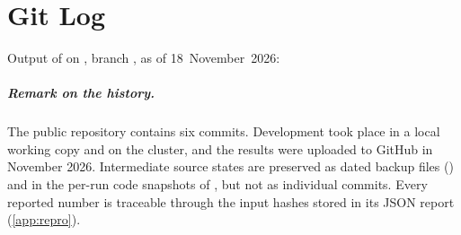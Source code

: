 \chapter{Git Log}\label{app:git}

Output of  on \RepositoryURL, branch , as of
18~November~2026:



\paragraph{Remark on the history.} The public repository contains six commits.
Development took place in a local working copy and on the cluster, and the
results were uploaded to GitHub in November 2026. Intermediate source
states are preserved as dated backup files () and in
the per-run code snapshots of , but not as individual
commits. Every reported number is traceable through the input hashes stored in its JSON
report (\cref{app:repro}).
